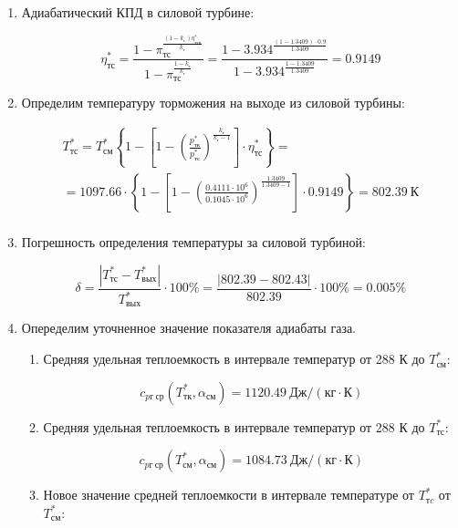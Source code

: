 \documentclass[a4paper,12pt]{article}
\begin{document}
\begin{enumerate}
	\item Адиабатический КПД в силовой турбине:
	
	\[
	\eta_{тс}^* = \frac{
					1 - \pi_{тс} ^ 
							{\frac{ (1 - k_г ) \eta_{тсп}^* }{ k_г }}
				}{
					1 - \pi_{тс} ^ 
							{\frac{ 1 - k_г }{ k_г }} 
				} = 
			\frac{
				1 - 3.934 ^ 
						{\frac{ (1 - 1.3409 ) \cdot 0.9 }{ 1.3409 }}
			}{
				1 - 3.934 ^ 
						{\frac{ 1 - 1.3409 }{ 1.3409 }} 
			} = 
		0.9149
	\]	
	
	\item Определим температуру торможения на выходе из силовой турбины:
	
	\begin{gather*}
	    T_{тс}^* = T_{см}^*
		\left\lbrace
			1 -
			\left[
				1 -
					\left(
						\frac{ p_{тк}^* }{ p_{тс}^* }
					\right) ^ \frac{ k_г }{ k_г - 1 }
			\right] \cdot \eta_{тс}^*
		\right\rbrace =\\
	    = 1097.66 \cdot
		\left\lbrace
			1 -
			\left[
				1 -
					\left(
						\frac{ 0.4111 \cdot 10^6 }{ 0.1045 \cdot 10^6 }
					\right) ^ \frac{ 1.3409 }{ 1.3409 - 1 }
			\right] \cdot 0.9149
		\right\rbrace =
	802.39\ К\\
	\end{gather*}
	
	\item Погрешность определения температуры за силовой турбиной:
	
	\[
	\delta = \frac{ 
					\left| T_{тс}^* - T_{вых}^* \right|
				}{ 
					T_{вых}^*
				} \cdot 100 \%= 
		\frac{ 
			\left| 802.39 - 802.43 \right|
		}{ 
			802.39
		} \cdot 100 \% =
	0.005 \%
	\]
	
	\item Опеределим уточненное значение показателя адиабаты газа.
	
	\begin{enumerate}
	
		\item Средняя удельная теплоемкость в интервале температур от 288 К до $ T_{см}^* $:
		
		\[
		c_{pг\ ср} (T_{тк}^*, \alpha_{см}) = 1120.49\ Дж / (кг \cdot К)
		\]
		
		\item Средняя удельная теплоемкость в интервале температур от 288 К до $ T_{тс}^* $:
		
		\[
		c_{pг\ ср} (T_{см}^*, \alpha_{см}) = 1084.73\ Дж / (кг \cdot К)
		\]
		
		\item Новое значение средней теплоемкости в интервале температуре от $ T_{тc}^* $ от $ T_{см}^* $:
		

\end{enumerate}
\end{enumerate}
\end{document}
